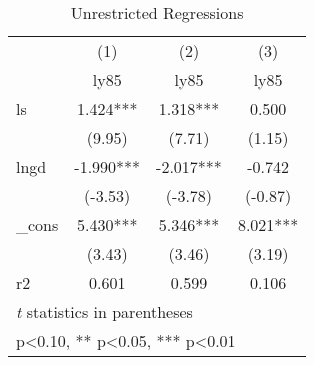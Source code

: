 \begin{table}[htbp]\centering
\def\sym#1{\ifmmode^{#1}\else\(^{#1}\)\fi}
\caption{Unrestricted Regressions}
\begin{tabular}{l*{3}{c}}
\hline\hline
            &\multicolumn{1}{c}{(1)}&\multicolumn{1}{c}{(2)}&\multicolumn{1}{c}{(3)}\\
            &\multicolumn{1}{c}{ly85}&\multicolumn{1}{c}{ly85}&\multicolumn{1}{c}{ly85}\\
\hline
ls          &       1.424***&       1.318***&       0.500   \\
            &      (9.95)   &      (7.71)   &      (1.15)   \\
[1em]
lngd        &      -1.990***&      -2.017***&      -0.742   \\
            &     (-3.53)   &     (-3.78)   &     (-0.87)   \\
[1em]
\_cons      &       5.430***&       5.346***&       8.021***\\
            &      (3.43)   &      (3.46)   &      (3.19)   \\
\hline
r2          &       0.601   &       0.599   &       0.106   \\
\hline\hline
\multicolumn{4}{l}{\footnotesize \textit{t} statistics in parentheses}\\
\multicolumn{4}{l}{\footnotesize * p<0.10, ** p<0.05, *** p<0.01}\\
\end{tabular}
\end{table}
